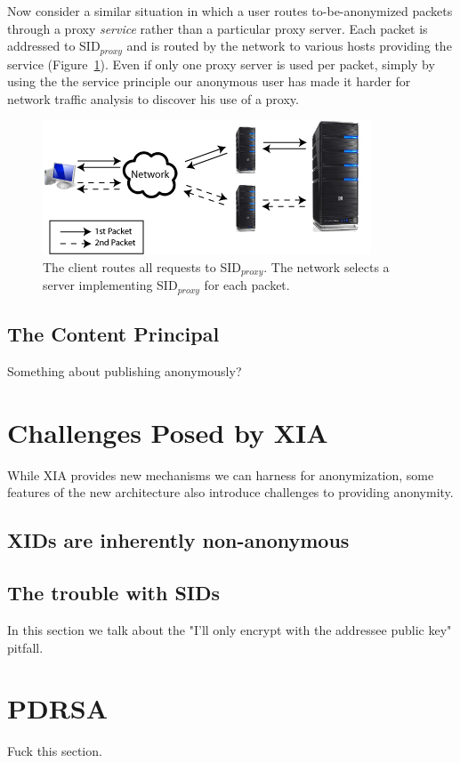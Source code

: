 \documentclass{article}
\begin{document}
Now consider a similar situation in which a user routes to-be-anonymized packets through a proxy \emph{service} rather than a particular proxy server. Each packet is addressed to SID$_{proxy}$ and is routed by the network to various hosts providing the service (Figure~\ref{fig:proxy-service}). Even if only one proxy server is used per packet, simply by using the the service principle our anonymous user has made it harder for network traffic analysis to discover his use of a proxy.
\begin{figure}
\includegraphics{images/proxy_service_multip_path.png}
\caption{The client routes all requests to SID$_{proxy}$. The network selects a server implementing SID$_{proxy}$ for each packet.}
\label{fig:proxy-service}
\end{figure}

\subsection{The Content Principal}
Something about publishing anonymously?

\section{Challenges Posed by XIA}
\label{sec:xia-challenges}
While XIA provides new mechanisms we can harness for anonymization, some features of the new architecture also introduce challenges to providing anonymity.
\subsection{XIDs are inherently non-anonymous}

\subsection{The trouble with SIDs}
In this section we talk about the "I'll only encrypt with the addressee public key" pitfall.


\section{PDRSA}
Fuck this section.
\end{document}
